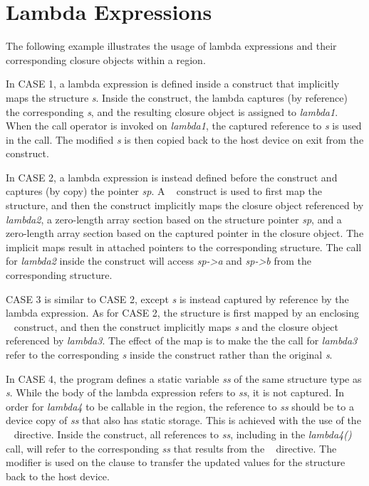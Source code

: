 \pagebreak
\section{Lambda Expressions}
\label{sec:lambda_expressions}



\cppspecificstart
The following example illustrates the usage of lambda expressions and their
corresponding closure objects within a  region.

In CASE 1, a lambda expression is defined inside a  construct
that implicitly maps the structure \textit{s}. Inside the construct, the
lambda captures (by reference) the corresponding \textit{s}, and the resulting
closure object is assigned to \textit{lambda1}.  When the call operator is
invoked on \textit{lambda1}, the captured reference to \textit{s} is used in
the call.  The modified \textit{s} is then copied back to the host device on
exit from the  construct.

In CASE 2, a lambda expression is instead defined before the 
construct and captures (by copy) the pointer \textit{sp}. A
~ construct is used to first map the structure, and
then the  construct implicitly maps the closure object
referenced by \textit{lambda2}, a zero-length array section based on the
structure pointer \textit{sp}, and a zero-length array section based on the
captured pointer in the closure object. The implicit maps result in attached
pointers to the corresponding structure. The call for \textit{lambda2} inside
the  construct will access \textit{sp->a} and \textit{sp->b}
from the corresponding structure.

CASE 3 is similar to CASE 2, except \textit{s} is instead captured by
reference by the lambda expression. As for CASE 2, the structure is first
mapped by an enclosing ~ construct, and then the
 construct implicitly maps \textit{s} and the closure object
referenced by \textit{lambda3}. The effect of the map is to make the
the call for \textit{lambda3} refer to the corresponding \textit{s} inside the
 construct rather than the original \textit{s}.

In CASE 4, the program defines a static variable \textit{ss} of the same
structure type as \textit{s}. While the body of the lambda expression refers
to \textit{ss}, it is not captured. In order for \textit{lambda4} to be
callable in the  region, the reference to \textit{ss} should be
to a device copy of \textit{ss} that also has static storage. This is achieved
with the use of the ~ directive.  Inside the
 construct, all references to \textit{ss}, including in the
\textit{lambda4()} call, will refer to the corresponding \textit{ss} that
results from the ~ directive. The 
modifier is used on the  clause to transfer the updated values for
the structure back to the host device.

\cppspecificend
